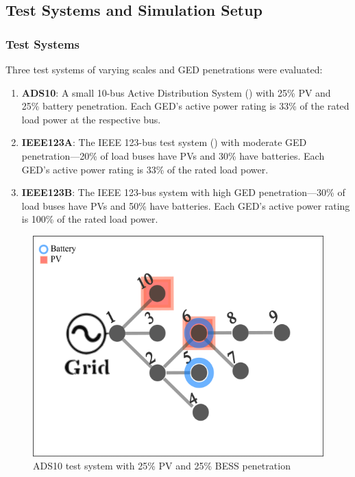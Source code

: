 \subsection{Test Systems and Simulation Setup}

\subsubsection{Test Systems}

Three test systems of varying scales and GED penetrations were evaluated:

\begin{enumerate}
    \item \textbf{ADS10}: A small 10-bus Active Distribution System () with 25\% PV and 25\% battery penetration. Each GED's active power rating is 33\% of the rated load power at the respective bus.
    
    \item \textbf{IEEE123A}: The IEEE 123-bus test system () with moderate GED penetration—20\% of load buses have PVs and 30\% have batteries. Each GED's active power rating is 33\% of the rated load power.
    
    \item \textbf{IEEE123B}: The IEEE 123-bus system with high GED penetration—30\% of load buses have PVs and 50\% have batteries. Each GED's active power rating is 100\% of the rated load power.
\end{enumerate}

\begin{figure}[t]
    \centering
    \includegraphics[width=0.75\linewidth]{figures/ads10-pv25-batt25.png}
    \caption{ADS10 test system with 25\% PV and 25\% BESS penetration}
    \label{fig:mpopf-tradeoffs-ads10}
\end{figure}


